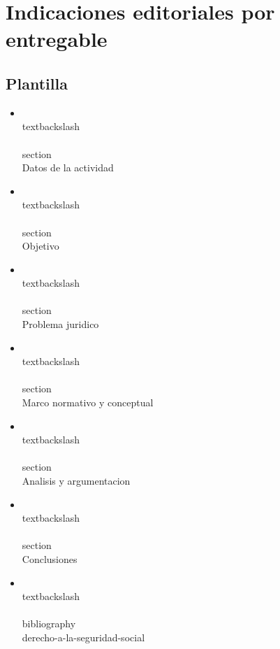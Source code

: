 \documentclass[12pt]{article}
\begin{document}
\section*{Indicaciones editoriales por entregable}

\subsection*{Plantilla}
\begin{itemize}[leftmargin=*]
  \item \\textbackslash\\{\\}section\\{Datos de la actividad\\}
  \item \\textbackslash\\{\\}section\\{Objetivo\\}
  \item \\textbackslash\\{\\}section\\{Problema juridico\\}
  \item \\textbackslash\\{\\}section\\{Marco normativo y conceptual\\}
  \item \\textbackslash\\{\\}section\\{Analisis y argumentacion\\}
  \item \\textbackslash\\{\\}section\\{Conclusiones\\}
  \item \\textbackslash\\{\\}bibliography\\{derecho-a-la-seguridad-social\\}

\end{itemize}
\end{document}
